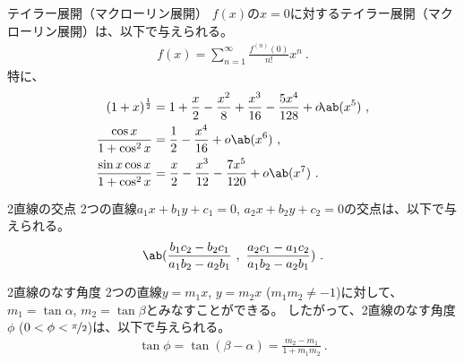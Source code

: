 




\begin{Formula}[label=formula:taylorexpansion]{テイラー展開（マクローリン展開）}
$f(x)$の$x = 0$に対するテイラー展開（マクローリン展開）は、以下で与えられる。
\begin{align*}
  f(x) = \sum_{n=1}^{\infty}\frac{f^{(n)}(0)}{n!}x^n\ .
\end{align*}
\tcbline*
特に、
\begin{align*}
  (1+x)^\frac12 &= 1+\frac x2-\frac{x^2}8+\frac{x^3}{16}-\frac{5x^4}{128}+o\!\ab(x^5)\ ,\\
  \frac{\cos x}{1+\cos^2x} &= \frac12-\frac{x^4}{16}+o\ab(x^6)\ ,\\
  \frac{\sin x\cos x}{1+\cos^2x} &= \frac x2-\frac{x^3}{12}-\frac{7x^5}{120}+o\ab(x^7)\ .
\end{align*}
\end{Formula}



\begin{Formula}[label=formula:intersectionof2lines]{2直線の交点}
2つの直線$a_1x+b_1y+c_1 = 0$, $a_2x+b_2y+c_2 = 0$の交点は、以下で与えられる。
\begin{align*}
  \ab(
  \frac{b_1c_2-b_2c_1}{a_1b_2-a_2b_1}~,~
  \frac{a_2c_1-a_1c_2}{a_1b_2-a_2b_1}
  )\ .
\end{align*}
\end{Formula}

\begin{Formula}[label=formula:anblebetween2lines]{2直線のなす角度}
2つの直線$y = m_1x$, $y = m_2x$ ($m_1m_2 \ne -1$)に対して、$m_1 = \tan\alpha$, $m_2 = \tan\beta$とみなすことができる。
したがって、2直線のなす角度$\phi$ ($0 < \phi < \nicefrac\pi2$)は、以下で与えられる。
\begin{align*}
  \tan\phi = \tan(\beta-\alpha) = \frac{m_2-m_1}{1+m_1m_2}\ .
\end{align*}
\end{Formula}




